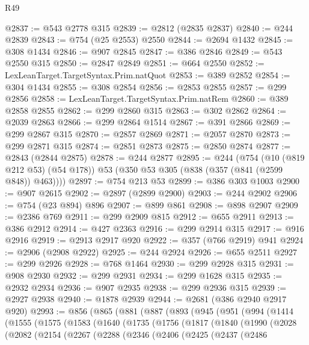 \begin{lexlean}{R49}
\begin{coremodule}
@2837 := @543 @2778 @315
@2839 := @2812 (@2835 @2837)
@2840 := @244 @2839
@2843 := @754 (@25 @2553) @2550
@2844 := @2694 @1432
@2845 := @308 @1434
@2846 := @907 @2845
@2847 := @386 @2846
@2849 := @543 @2550 @315
@2850 := @2847 @2849
@2851 := @664 @2550
@2852 := LexLeanTarget.TargetSyntax.Prim.natQuot
@2853 := @389 @2852
@2854 := @304 @1434
@2855 := @308 @2854
@2856 := @2853 @2855
@2857 := @299 @2856
@2858 := LexLeanTarget.TargetSyntax.Prim.natRem
@2860 := @389 @2858 @2855
@2862 := @299 @2860 @315
@2863 := @302 @2862
@2864 := @2039 @2863
@2866 := @299 @2864 @1514
@2867 := @391 @2866
@2869 := @299 @2867 @315
@2870 := @2857 @2869
@2871 := @2057 @2870
@2873 := @299 @2871 @315
@2874 := @2851 @2873
@2875 := @2850 @2874
@2877 := @2843 (@2844 @2875)
@2878 := @244 @2877
@2895 := @244
    (@754
      (@10 (@819 @212 @53) (@54 @178))
      @53
      (@350 @53 @305 (@838 (@357 (@841 (@2599 @848)) @463))))
@2897 := @754 @213 @53
@2899 := @386 @303 @1003
@2900 := @907 @2615
@2902 := @2897 (@2899 @2900)
@2903 := @244 @2902
@2906 := @754 (@23 @894) @896
@2907 := @899 @861
@2908 := @898 @2907
@2909 := @2386 @769
@2911 := @299 @2909 @815
@2912 := @655 @2911
@2913 := @386 @2912
@2914 := @427 @2363
@2916 := @299 @2914 @315
@2917 := @916 @2916
@2919 := @2913 @2917 @920
@2922 := @357 (@766 @2919) @941
@2924 := @2906 (@2908 @2922)
@2925 := @244 @2924
@2926 := @655 @2511
@2927 := @299 @2926
@2928 := @768 @1464
@2930 := @299 @2928 @315
@2931 := @908 @2930
@2932 := @299 @2931
@2934 := @299 @1628 @315
@2935 := @2932 @2934
@2936 := @907 @2935
@2938 := @299 @2936 @315
@2939 := @2927 @2938
@2940 := @1878 @2939
@2944 := @2681 (@386 @2940 @2917 @920)
@2993 := @856
    (@865
      (@881
        (@887
          (@893
            (@945
              (@951
                (@994
                  (@1414
                    (@1555
                      (@1575
                        (@1583
                          (@1640
                            (@1735
                              (@1756
                                (@1817
                                  (@1840
                                    (@1990
                                      (@2028
                                        (@2082
                                          (@2154
                                            (@2267
                                              (@2288
                                                (@2346
                                                  (@2406
                                                    (@2425
                                                      (@2437
                                                        (@2486

\end{coremodule}
\end{lexlean}

